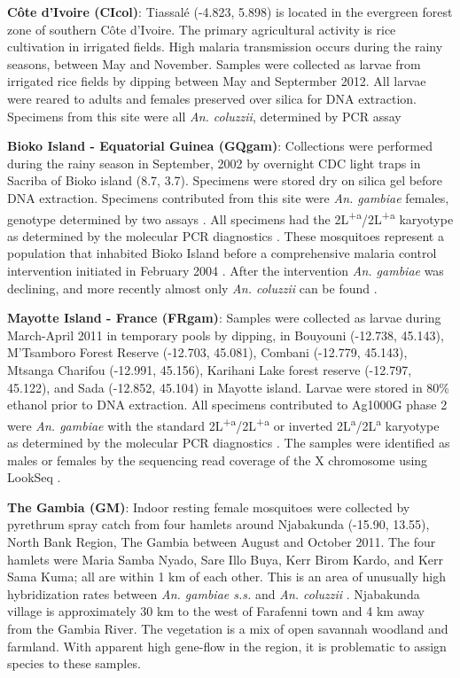 \documentclass[a4paper,11pt,abstracton,hidelinks]{scrartcl}
\begin{document}
%
\textbf{C\^{o}te d'Ivoire (CIcol)}: Tiassal\'{e} (-4.823, 5.898) is located in the evergreen forest zone of southern C\^{o}te d'Ivoire.
%
The primary agricultural activity is rice cultivation in irrigated fields.
%
High malaria transmission occurs during the rainy seasons, between May and November.
%
Samples were collected as larvae from irrigated rice fields by dipping between May and Septermber 2012.
%
All larvae were reared to adults and females preserved over silica for DNA extraction.
%
Specimens from this site were all \textit{An. coluzzii}, determined by PCR assay \cite{santolamazza2008}

\textbf{Bioko Island - Equatorial Guinea (GQgam)}: Collections were performed during the rainy season in September, 2002 by overnight CDC light traps in Sacriba of Bioko island (8.7, 3.7).
%
Specimens were stored dry on silica gel before DNA extraction.
%
Specimens contributed from this site were \textit{An. gambiae} females, genotype determined by two assays \cite{scott1993, santolamazza2004}.
%
All specimens had the 2L\textsuperscript{+a}/2L\textsuperscript{+a} karyotype as determined by the molecular PCR diagnostics \cite{White2007}. 
%
These mosquitoes represent a population that inhabited Bioko Island before a comprehensive malaria control intervention initiated in February 2004 \cite{Sharp2007}. 
%
After the intervention \textit{An. gambiae} was declining, and more recently almost only \textit{An. coluzzii} can be found \cite{Overgaard2012}.

%
\textbf{Mayotte Island - France (FRgam)}: Samples were collected as larvae during March-April 2011 in temporary pools by dipping, in Bouyouni (-12.738, 45.143), M'Tsamboro Forest Reserve (-12.703, 45.081), Combani (-12.779, 45.143), Mtsanga Charifou (-12.991, 45.156), Karihani Lake forest reserve (-12.797, 45.122), and Sada (-12.852, 45.104) in Mayotte island.
%
Larvae were stored in 80\% ethanol prior to DNA extraction. 
%
All specimens contributed to Ag1000G phase 2 were \textit{An. gambiae} \cite{santolamazza2004} with the standard 2L\textsuperscript{+a}/2L\textsuperscript{+a} or inverted 2L\textsuperscript{a}/2L\textsuperscript{a} karyotype as determined by the molecular PCR diagnostics \cite{White2007}.
%
The samples were identified as males or females by the sequencing read coverage of the X chromosome using LookSeq \cite{Manske2009}.

%
\textbf{The Gambia (GM)}: Indoor resting female mosquitoes were collected by pyrethrum spray catch from four hamlets around Njabakunda (-15.90, 13.55), North Bank Region, The Gambia between August and October 2011.
%
The four hamlets were Maria Samba Nyado, Sare Illo Buya, Kerr Birom Kardo, and Kerr Sama Kuma; all are within 1 km of each other.
%
This is an area of unusually high hybridization rates between \textit{An. gambiae s.s.} and \textit{An. coluzzii} \cite{Caputo2008, Nwakanma2013}.
%
Njabakunda village is approximately 30 km to the west of Farafenni town and 4 km away from the Gambia River.
%
The vegetation is a mix of open savannah woodland and farmland.
%
With apparent high gene-flow in the region, it is problematic to assign species to these samples.
\end{document}
